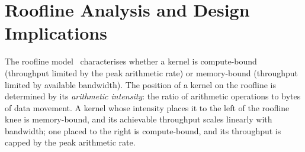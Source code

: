 \section{Roofline Analysis and Design Implications}
\label{sec:roofline}

The roofline model~\citep{williams2009roofline} characterises whether a
kernel is compute-bound (throughput limited by the peak arithmetic rate)
or memory-bound (throughput limited by available bandwidth). The position
of a kernel on the roofline is determined by its \emph{arithmetic
intensity}: the ratio of arithmetic operations to bytes of data movement.
A kernel whose intensity places it to the left of the roofline knee is
memory-bound, and its achievable throughput scales linearly with
bandwidth; one placed to the right is compute-bound, and its throughput
is capped by the peak arithmetic rate.

